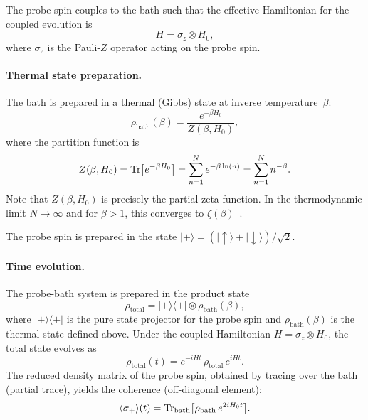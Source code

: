 The probe spin couples to the bath such that the effective Hamiltonian for the coupled
evolution is
\begin{equation}\label{eq:H-coupled}
  H = \sigma_z \otimes H_0,
\end{equation}
where $\sigma_z$ is the Pauli-$Z$ operator acting on the probe spin.

\paragraph{Thermal state preparation.}
The bath is prepared in a thermal (Gibbs) state at inverse temperature~$\beta$:
\begin{equation}\label{eq:thermal}
  \rho_{\mathrm{bath}}(\beta) = \frac{e^{-\beta H_0}}{Z(\beta,H_0)},
\end{equation}
where the partition function is
\begin{equation}\label{eq:partition}
  Z(\beta,H_0) = \operatorname{Tr}\bigl[e^{-\beta H_0}\bigr]
  = \sum_{n=1}^{N} e^{-\beta\ln(n)}
  = \sum_{n=1}^{N} n^{-\beta}.
\end{equation}
Note that $Z(\beta,H_0)$ is precisely the partial zeta function. In the thermodynamic
limit $N \to \infty$ and for $\beta > 1$, this converges to
$\zeta(\beta)$~\cite{titchmarsh1986}.

The probe spin is prepared in the state
$|{+}\rangle = (|{\uparrow}\rangle + |{\downarrow}\rangle)/\sqrt{2}$.

\paragraph{Time evolution.}
The probe-bath system is prepared in the product state
\begin{equation}\label{eq:initial-state}
  \rho_{\mathrm{total}} = |{+}\rangle\langle{+}| \otimes \rho_{\mathrm{bath}}(\beta),
\end{equation}
where $|{+}\rangle\langle{+}|$ is the pure state projector for the probe spin and
$\rho_{\mathrm{bath}}(\beta)$ is the thermal state defined above. Under the coupled
Hamiltonian $H = \sigma_z \otimes H_0$, the total state evolves as
\begin{equation}\label{eq:evolution}
  \rho_{\mathrm{total}}(t) = e^{-iHt}\,\rho_{\mathrm{total}}\,e^{iHt}.
\end{equation}
The reduced density matrix of the probe spin, obtained by tracing over the bath
(partial trace), yields the coherence (off-diagonal element):
\begin{equation}\label{eq:coherence}
  \langle\sigma_+\rangle(t) = \operatorname{Tr}_{\mathrm{bath}}\bigl[\rho_{\mathrm{bath}}\,e^{2iH_0 t}\bigr].
\end{equation}

